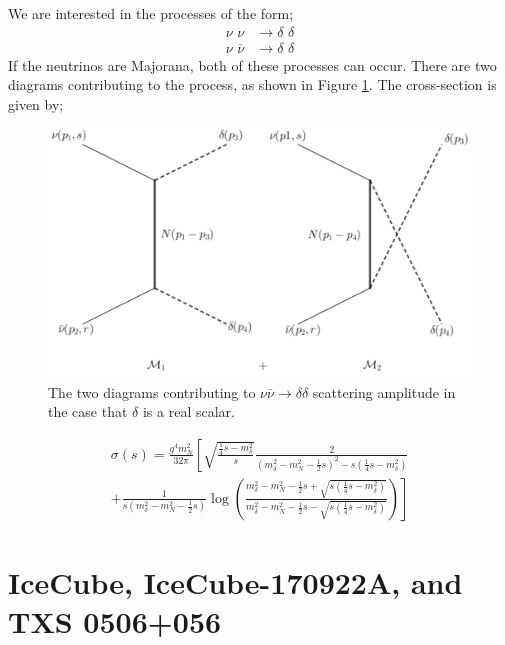 \documentclass[11pt]{article}
\numberwithin{equation}{section}
\numberwithin{figure}{section}
\numberwithin{table}{section}
\begin{document}
We are interested in the processes of the form;
\begin{align*}
\nu \,\, \nu &\longrightarrow \delta \,\, \delta\\
\nu \,\, \overline{\nu} &\longrightarrow \delta \,\, \delta
\end{align*}
If the neutrinos are Majorana, both of these processes can occur. There are two diagrams contributing to the process, as shown in Figure \ref{fig:feyn}. The cross-section is given by;
\begin{figure}[t]
\centering
\includegraphics[width=0.6\linewidth]{feyndiag}
\caption{The two diagrams contributing to $\nu \bar{\nu} \rightarrow \delta \delta$ scattering amplitude in the case that $\delta$ is a real scalar.}
\label{fig:feyn}
\end{figure}
\begin{multline}
\label{eq:sigma}
\sigma(s) = \frac{g^4 m_N^2}{32 \pi}\left[\sqrt{\frac{\frac{1}{4}s - m_\delta^2}{s}}\frac{2}{\left(m_\delta^2 - m_N^2 - \frac{1}{2}s\right)^2 - s\left(\frac{1}{4}s - m_\delta^2\right)} \right. \\ \left. + \frac{1}{s\left(m_\delta^2 - m_N^2 - \frac{1}{2}s\right)}\log\left(\frac{m_\delta^2 - m_N^2 - \frac{1}{2}s + \sqrt{s\left(\frac{1}{4}s - m_\delta^2\right)}}{m_\delta^2 - m_N^2 - \frac{1}{2}s - \sqrt{s\left(\frac{1}{4}s - m_\delta^2\right)}}\right)\right]
\end{multline}


\section{IceCube, IceCube-170922A, and TXS 0506+056}\label{sec:icecube}
\end{document}
